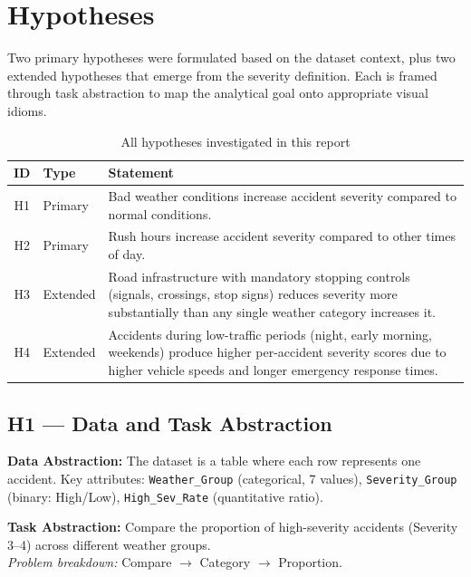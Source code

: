 
\section{Hypotheses}

Two primary hypotheses were formulated based on the dataset context, plus two
extended hypotheses that emerge from the severity definition.
Each is framed through task abstraction to map the analytical goal onto
appropriate visual idioms.

\begin{table}[H]
\centering\small
\begin{tabularx}{\linewidth}{@{} c l X @{}}
  \toprule
  \textbf{ID} & \textbf{Type} & \textbf{Statement} \\ \midrule
  H1 & Primary
    & Bad weather conditions increase accident severity compared to
      normal conditions. \\[4pt]
  H2 & Primary
    & Rush hours increase accident severity compared to other times
      of day. \\[4pt]
  H3 & Extended
    & Road infrastructure with mandatory stopping controls (signals,
      crossings, stop signs) reduces severity more substantially than
      any single weather category increases it. \\[4pt]
  H4 & Extended
    & Accidents during low-traffic periods (night, early morning,
      weekends) produce higher per-accident severity scores due to
      higher vehicle speeds and longer emergency response times. \\
  \bottomrule
\end{tabularx}
\caption{All hypotheses investigated in this report}
\end{table}

\subsection{H1 — Data and Task Abstraction}

\textbf{Data Abstraction:}
The dataset is a table where each row represents one accident.
Key attributes: \texttt{Weather\_Group} (categorical, 7 values),
\texttt{Severity\_Group} (binary: High/Low),
\texttt{High\_Sev\_Rate} (quantitative ratio).

\textbf{Task Abstraction:}
Compare the proportion of high-severity accidents (Severity 3--4) across
different weather groups.\\
\textit{Problem breakdown:} Compare $\rightarrow$ Category $\rightarrow$ Proportion.

